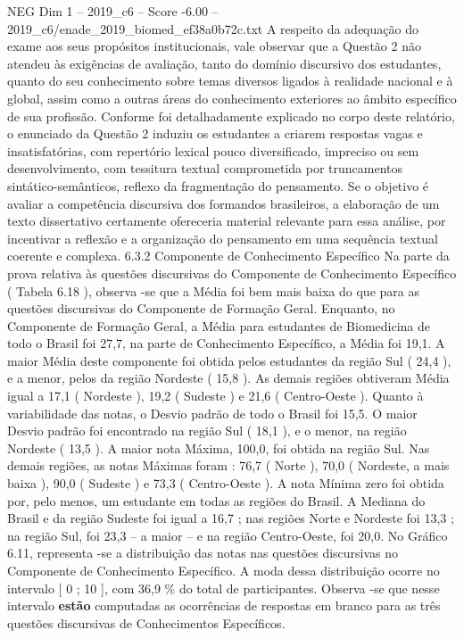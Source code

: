 \begin{textsample}{NEG Dim 1 – 2019\_c6 – Score -6.00 – 2019\_c6/enade\_2019\_biomed\_ef38a0b72c.txt}
A respeito da adequação do exame aos seus propósitos institucionais, vale observar que a Questão 2 não atendeu às exigências de avaliação, tanto do domínio discursivo dos estudantes, quanto do seu conhecimento sobre temas diversos ligados à realidade nacional e à global, assim como a outras áreas do conhecimento exteriores ao âmbito específico de sua profissão.
Conforme foi detalhadamente explicado no corpo deste relatório, o enunciado da Questão 2 induziu os estudantes a criarem respostas vagas e insatisfatórias, com repertório lexical pouco diversificado, impreciso ou sem desenvolvimento, com tessitura textual comprometida por truncamentos sintático-semânticos, reflexo da fragmentação do pensamento.
Se o objetivo é avaliar a competência discursiva dos formandos brasileiros, a elaboração de um texto dissertativo certamente ofereceria material relevante para essa análise, por incentivar a reflexão e a organização do pensamento em uma sequência textual coerente e complexa. 6.3.2 Componente de Conhecimento Específico Na parte da prova relativa às questões discursivas do Componente de Conhecimento Específico ( Tabela 6.18 ), observa -se que a Média foi bem mais baixa do que para as questões discursivas do Componente de Formação Geral.
Enquanto, no Componente de Formação Geral, a Média para estudantes de Biomedicina de todo o Brasil foi 27,7, na parte de Conhecimento Específico, a Média foi 19,1.
A maior Média deste componente foi obtida pelos estudantes da região Sul ( 24,4 ), e a menor, pelos da região Nordeste ( 15,8 ).
As demais regiões obtiveram Média igual a 17,1 ( Nordeste ), 19,2 ( Sudeste ) e 21,6 ( Centro-Oeste ).
Quanto à variabilidade das notas, o Desvio padrão de todo o Brasil foi 15,5.
O maior Desvio padrão foi encontrado na região Sul ( 18,1 ), e o menor, na região Nordeste ( 13,5 ).
A maior nota Máxima, 100,0, foi obtida na região Sul.
Nas demais regiões, as notas Máximas foram : 76,7 ( Norte ), 70,0 ( Nordeste, a mais baixa ), 90,0 ( Sudeste ) e 73,3 ( Centro-Oeste ).
A nota Mínima zero foi obtida por, pelo menos, um estudante em todas as regiões do Brasil.
A Mediana do Brasil e da região Sudeste foi igual a 16,7 ; nas regiões Norte e Nordeste foi 13,3 ; na região Sul, foi 23,3 – a maior – e na região Centro-Oeste, foi 20,0.
No Gráfico 6.11, representa -se a distribuição das notas nas questões discursivas no Componente de Conhecimento Específico.
A moda dessa distribuição ocorre no intervalo [ 0 ; 10 ], com 36,9 \% do total de participantes.
Observa -se que nesse intervalo \textbf{estão} computadas as ocorrências de respostas em branco para as três questões discursivas de Conhecimentos Específicos.

\end{textsample}
